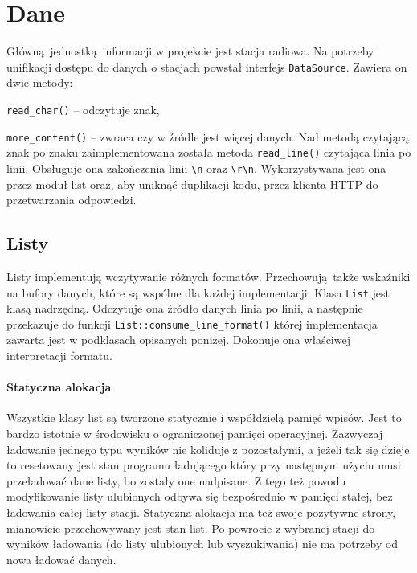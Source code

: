 \documentclass[polish]{aghengthesis}
\let\tempone\itemize
\let\temptwo\enditemize
\renewenvironment{itemize}{\tempone\setlength{\itemsep}{0cm}}{\temptwo}
\begin{document}
	\section{Dane}
		Główną jednostką informacji w projekcie jest stacja radiowa. Na potrzeby unifikacji dostępu do danych o stacjach powstał interfejs \lstinline|DataSource|. Zawiera on dwie metody:
		\begin{itemize}
			\item \lstinline|read_char()| -- odczytuje znak,
			\item \lstinline|more_content()| -- zwraca czy w źródle jest więcej danych.
		\end{itemize}
		Nad metodą czytającą znak po znaku zaimplementowana została metoda \lstinline|read_line()| czytająca linia po linii. Obsługuje ona zakończenia linii \lstinline|\n| oraz \lstinline|\r\n|. Wykorzystywana jest ona przez moduł list oraz, aby uniknąć duplikacji kodu, przez klienta HTTP do przetwarzania odpowiedzi.
		
		\subsection{Listy}
			Listy implementują wczytywanie różnych formatów. Przechowują także wskaźniki na bufory danych, które są wspólne dla każdej implementacji. Klasa \lstinline|List| jest klasą nadrzędną. Odczytuje ona źródło danych linia po linii, a następnie przekazuje do funkcji \lstinline|List::consume_line_format()| której implementacja zawarta jest w podklasach opisanych poniżej. Dokonuje ona właściwej interpretacji formatu.
			
			\paragraph{Statyczna alokacja} Wszystkie klasy list są tworzone statycznie i współdzielą pamięć wpisów. Jest to bardzo istotnie w środowisku o ograniczonej pamięci operacyjnej. Zazwyczaj ładowanie jednego typu wyników nie koliduje z pozostałymi, a jeżeli tak się dzieje to resetowany jest stan programu ładującego który przy następnym użyciu musi przeładować dane listy, bo zostały one nadpisane. Z tego też powodu modyfikowanie listy ulubionych odbywa się bezpośrednio w pamięci stałej, bez ładowania całej listy stacji. Statyczna alokacja ma też swoje pozytywne strony, mianowicie przechowywany jest stan list. Po powrocie z wybranej stacji do wyników ładowania (do listy ulubionych lub wyszukiwania) nie ma potrzeby od nowa ładować danych.
			
\end{document}
